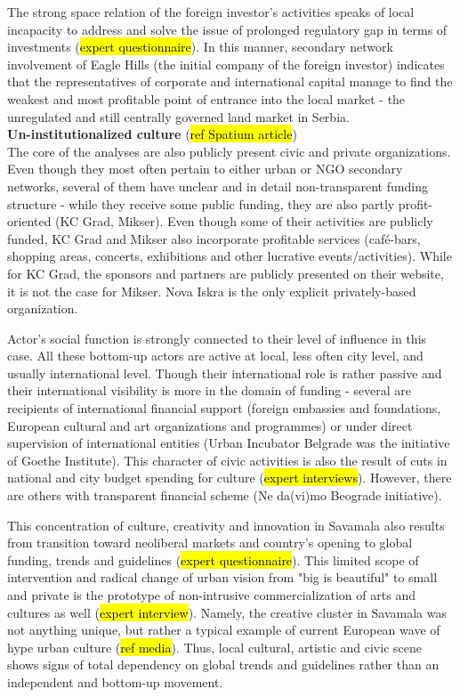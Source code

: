 \documentclass[11pt]{report}
\begin{document}
The strong space relation of the foreign investor's activities speaks of local incapacity to address and solve the issue of prolonged regulatory gap in terms of investments (\hl{expert questionnaire}).
In this manner, secondary network involvement of Eagle Hills (the initial company of the foreign investor) indicates that the representatives of corporate and international capital manage to find the weakest and most profitable point of entrance into the local market - the unregulated and still centrally governed land market in Serbia.
\\

\textbf{Un-institutionalized culture} (\hl{ref Spatium article})
\\
The core of the analyses are also publicly present civic and private organizations.
Even though they most often pertain to either urban or NGO secondary networks, several of them have unclear and in detail non-transparent funding structure - while they receive some public funding, they are also partly profit-oriented (KC Grad, Mikser).
Even though some of their activities are publicly funded, KC Grad and Mikser also incorporate profitable services (café-bars, shopping areas, concerts, exhibitions and other lucrative events/activities).
While for KC Grad, the sponsors and partners are publicly presented on their website, it is not the case for Mikser.
Nova Iskra is the only explicit privately-based organization.

Actor’s social function is strongly connected to their level of influence in this case.
All these bottom-up actors are active at local, less often city level, and usually international level. Though their international role is rather passive and their international visibility is more in the domain of funding - several are recipients of international financial support (foreign embassies and foundations, European cultural and art organizations and programmes) or under direct supervision of international entities (Urban Incubator Belgrade was the initiative of Goethe Institute).
This character of civic activities is also the result of cuts in national and city budget spending for culture (\hl{expert interviews}).
However, there are others with transparent financial scheme (Ne da(vi)mo Beograde initiative). 

This concentration of culture, creativity and innovation in Savamala also results from transition toward neoliberal markets and country's opening to global funding, trends and guidelines (\hl{expert questionnaire}).
This limited scope of intervention and radical change of urban vision from "big is beautiful" to small and private is the prototype of non-intrusive commercialization of arts and cultures as well (\hl{expert interview}).
Namely, the creative cluster in Savamala was not anything unique, but rather a typical example of current European wave of hype urban culture (\hl{ref media}).
Thus, local cultural, artistic and civic scene shows signs of total dependency on global trends and guidelines rather than an independent and bottom-up movement. 
\end{document}
